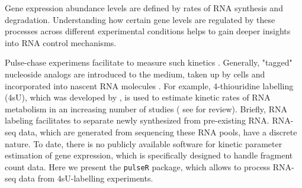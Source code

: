 Gene expression abundance levels are defined by rates of RNA synthesis and degradation.
Understanding how certain gene levels are regulated by these processes across different
experimental conditions helps to gain deeper insights into RNA control mechanisms.
\par
Pulse-chase experimens facilitate to measure such kinetics \citep{wachutka2016measures}. 
Generally, "tagged" nucleoside analogs are introduced to the medium, 
taken up by cells and incorporated into nascent RNA molecules \citep{dieterich2013computational}.
For example, 4-thiouridine labelling (4sU), which was developed by \cite{dolken2008high}, is used to estimate 
kinetic rates of RNA metabolism in an increasing number of studies ( 
see \cite{wachutka2016measures} for review). Briefly, RNA labeling facilitates to separate newly synthesized from pre-existing RNA.
RNA-seq data, which are generated from sequencing these RNA pools, have a discrete nature.
To date, there is no publicly available software for kinetic parameter estimation of gene expression, which is specifically designed to handle 
fragment count data. Here we present the \verb|pulseR| package, which allows to 
process RNA-seq data from 4sU-labelling experiments.
